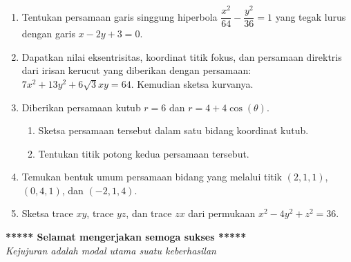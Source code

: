 \documentclass[10pt,a4paper]{article}
\begin{document}
\vspace{1em}


\begin{enumerate}
    \item Tentukan persamaan garis singgung hiperbola $\dfrac{x^2}{64} - \dfrac{y^2}{36} = 1$ yang tegak lurus dengan garis $x - 2y + 3 = 0$.
    \item Dapatkan nilai eksentrisitas, koordinat titik fokus, dan persamaan direktris dari irisan kerucut yang diberikan dengan persamaan: $7x^2 + 13y^2 + 6\sqrt{3}xy = 64$. Kemudian sketsa kurvanya.
    \item Diberikan persamaan kutub $r = 6$ dan $r = 4 + 4\cos(\theta)$.
    \begin{enumerate}[label=(\alph*)]
        \item Sketsa persamaan tersebut dalam satu bidang koordinat kutub.
        \item Tentukan titik potong kedua persamaan tersebut.
    \end{enumerate}
    \item Temukan bentuk umum persamaan bidang yang melalui titik $(2,1,1)$, $(0,4,1)$, dan $(-2,1,4)$.
    \item Sketsa trace $xy$, trace $yz$, dan trace $zx$ dari permukaan $x^2 - 4y^2 + z^2 = 36$.
\end{enumerate}

\vspace{2em}
\begin{center}
    \textbf{***** Selamat mengerjakan semoga sukses *****}\\[0.5em]
    \textit{Kejujuran adalah modal utama suatu keberhasilan}
\end{center}
\end{document}
